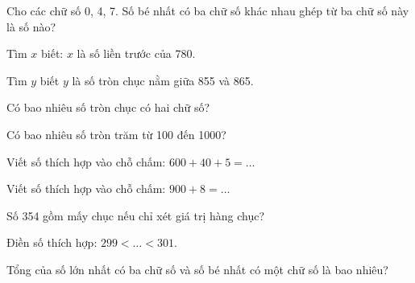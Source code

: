 \begin{ex}
Cho các chữ số 0, 4, 7. Số bé nhất có ba chữ số khác nhau ghép từ ba chữ số này là số nào?
\end{ex}

\begin{ex}
Tìm $x$ biết: $x$ là số liền trước của 780.
\end{ex}

\begin{ex}
Tìm $y$ biết $y$ là số tròn chục nằm giữa 855 và 865.
\end{ex}

\begin{ex}
Có bao nhiêu số tròn chục có hai chữ số?
\end{ex}

\begin{ex}
Có bao nhiêu số tròn trăm từ 100 đến 1000?
\end{ex}

\begin{ex}
Viết số thích hợp vào chỗ chấm: $600 + 40 + 5 = \dots$
\end{ex}

\begin{ex}
Viết số thích hợp vào chỗ chấm: $900 + 8 = \dots$
\end{ex}

\begin{ex}
Số 354 gồm mấy chục nếu chỉ xét giá trị hàng chục?
\end{ex}

\begin{ex}
Điền số thích hợp: $299 < \dots < 301$.
\end{ex}

\begin{ex}
Tổng của số lớn nhất có ba chữ số và số bé nhất có một chữ số là bao nhiêu?
\end{ex}

